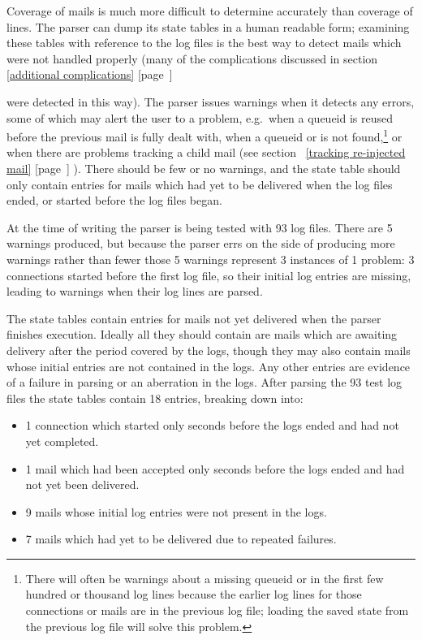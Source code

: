 \documentclass[a4paper,12pt,draft]{article}
\newcommand{\refwithpage}[1]{%
    \empty{}\ref{#1} [page~\pageref{#1}]%
}
\begin{document}
Coverage of mails is much more difficult to determine accurately than
coverage of lines.  The parser can dump its state tables in a human
readable form; examining these tables with reference to the log files is
the best way to detect mails which were not handled properly (many of the
complications discussed in section~\refwithpage{additional complications}
were detected in this way).  The parser issues warnings when it detects any
errors, some of which may alert the user to a problem, e.g.\ when a queueid
is reused before the previous mail is fully dealt with, when a queueid or
\pid{} is not found,\footnote{There will often be warnings about a missing
queueid or \pid{} in the first few hundred or thousand log lines because the
earlier log lines for those connections or mails are in the previous log
file; loading the saved state from the previous log file will solve this
problem.} or when there are problems tracking a child mail (see
section~\refwithpage{tracking re-injected mail}).  There should be few or
no warnings, and the state table should only contain entries for mails
which had yet to be delivered when the log files ended, or started before
the log files began.

At the time of writing the parser is being tested with 93 log files.  There
are 5 warnings produced, but because the parser errs on the side of
producing more warnings rather than fewer those 5 warnings represent 3
instances of 1 problem: 3 connections started before the first log file, so
their initial log entries are missing, leading to warnings when their log
lines are parsed.

The state tables contain entries for mails not yet delivered when the
parser finishes execution.  Ideally all they should contain are mails which
are awaiting delivery after the period covered by the logs, though they may
also contain mails whose initial entries are not contained in the logs.
Any other entries are evidence of a failure in parsing or an aberration in
the logs.  After parsing the 93 test log files the state tables contain 18
entries, breaking down into:

\begin{itemize}

    \item 1 connection which started only seconds before the logs ended and
        had not yet completed.

    \item 1 mail which had been accepted only seconds before the logs ended
        and had not yet been delivered.

    \item 9 mails whose initial log entries were not present in the logs.

    \item 7 mails which had yet to be delivered due to repeated failures.

\end{itemize}
\end{document}
